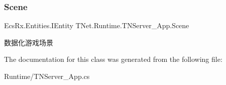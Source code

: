 \subsubsection{\texorpdfstring{Scene}{Scene}}
{\footnotesize\ttfamily Ecs\+Rx.\+Entities.\+I\+Entity T\+Net.\+Runtime.\+T\+N\+Server\+\_\+\+App.\+Scene\hspace{0.3cm}{\ttfamily [get]}}



数据化游戏场景 



The documentation for this class was generated from the following file\+:\begin{DoxyCompactItemize}
\item 
Runtime/T\+N\+Server\+\_\+\+App.\+cs\end{DoxyCompactItemize}
